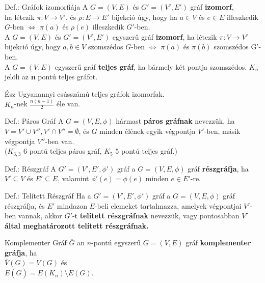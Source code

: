 \documentclass{beamer}
\begin{document}
\begin{frame}

\begin{block}{Def.: Gráfok izomorfiája}
A $G = (V, E)$ és $G' = (V', E')$ gráf \textbf{izomorf},\\
ha létezik ${\pi} : V \rightarrow V'$, és $\rho : E \rightarrow E'$ bijekció úgy, hogy ha $a \in V$ és $e \in E$ illeszkedik $G$-ben $\iff$ ${\pi}(a)$ és ${\rho}(e)$ illeszkedik $G'$-ben.\\
\bigskip
A $G = (V, E)$ és $G' = (V', E')$ egyszerű gráf \textbf{izomorf}, ha létezik ${\pi} : V \rightarrow V'$ bijekció úgy, hogy $a, b \in V$ szomszédos $G$-ben $\iff$ ${\pi}(a)$ és ${\pi}(b)$ szomszédos G'-ben.\\
\bigskip
A $G = (V, E)$ egyszerű gráf \textbf{teljes gráf}, ha bármely két pontja szomszédos. \textbf{$K_n$} jelöli az \textbf{n} pontú teljes gráfot.
\end{block}

\begin{block}{Ész}
Ugyanannyi csússzámú teljes gráfok izomorfak.\\
\bigskip
$K_n$-nek $\frac{n(n - 1)}{2}$ éle van.
\end{block}
\end{frame}

\begin{frame}

\begin{block}{Def.: Páros Gráf}
A $G = (V, E, {\phi})$ hármast \textbf{páros gráfnak} nevezzük, ha $V = V' \cup V'', V' \cap V'' = \emptyset$, és $G$ minden élének egyik végpontja $V'$-ben, másik végpontja $V''$-ben van.\\
\medskip
($K_{3, 3}$ 6 pontú teljes páros gráf, $K_5$ 5 pontú teljes gráf.)
\end{block}
\begin{block}{Def.: Részgráf}
A $G' = (V', E', {\phi}')$ gráf a $G = (V, E, {\phi})$ gráf \textbf{részgráfja}, ha\\
$V' \subseteq V$ és $E' \subseteq E$, valamint ${\phi}'(e) = {\phi}(e)$ minden $e \in E'$-re.
\end{block}
\begin{block}{Def.: Telített Részgráf}
Ha a $G' = (V', E', {\phi}')$ gráf a $G = (V, E, {\phi})$ gráf részgráfja, és $E'$ mindazon $E$-beli elemeket tartalmazza, amelyek végpontjai $V'$-ben vannak, akkor $G'$-t \textbf{telített részgráfnak} nevezzük, vagy pontosabban \textbf{$V'$ által meghatározott telített részgráfnak.}
\end{block}
\begin{block}{Komplementer Gráf}
$\overline{G}$ an $n$-pontú egyszerű $G = (V, E)$ gráf \textbf{komplementer gráfja}, ha\\
\smallskip
$\overline{V}(G) = V(G)$ és\\
$E(\overline{G}) = E(K_n) \setminus E(G)$.
\end{block}

\end{frame}
\end{document}
